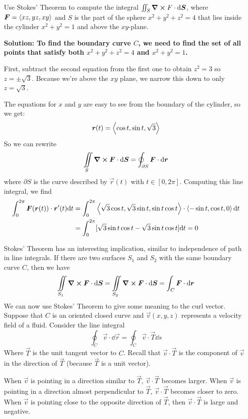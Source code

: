 \begin{example}
    Use Stokes' Theorem to compute the integral $\iint_S \curl F \cdot \dd \boldsymbol{S}$, where $\boldsymbol{F} = \left\langle xz, yz, xy\right\rangle$ and $S$ is the part of the sphere $x^2+y^2+z^2=4$ that lies inside the cylinder $x^2+y^2=1$ and above the $xy$-plane. \par
    \bf{Solution:} To find the boundary curve $C$, we need to find the set of all points that satisfy both $x^2+y^2+z^2=4$ and $x^2+y^2=1$. \par 
    First, subtract the second equation from the first one to obtain $z^2=3$ so $z=\pm \sqrt{3}$. Because we're above the $xy$ plane, we narrow this down to only $z=\sqrt 3$. \par
    The equations for $x$ and $y$ are easy to see from the boundary of the cylinder, so we get:
    \[ \boldsymbol{r}(t) = \left\langle \cos t, \sin t, \sqrt 3\right\rangle\]
    So we can rewrite
    \[ \iint\limits_S \curl \boldsymbol{F} \cdot \dd \boldsymbol{S} = \oint_{\partial S} \boldsymbol{F} \cdot \dd \boldsymbol{r}\]
    where $\partial S$ is the curve described by $\vec r(t)$ with $t\in[0,2\pi]$. Computing this line integral, we find
    \begin{align*}
        \int_0^{2\pi} \boldsymbol{F}(\boldsymbol{r}(t))\cdot \boldsymbol{r}'(t)\dd t &= \int_0^{2\pi}\left\langle\sqrt{3}\cos t, \sqrt{3}\sin t, \sin t\cos t\right\rangle \cdot \left\langle -\sin t, \cos t, 0\right\rangle \dd t \\
        &= \int_0^{2\pi}[\sqrt{3}\sin t \cos t - \sqrt{3}\sin t\cos t] \dd t = 0
    \end{align*}
\end{example}
Stokes' Theorem has an interesting implication, similar to independence of path in line integrals. If there are two surfaces $S_1$ and $S_2$ with the same boundary curve $C$, then we have
\[ \iint\limits_{S_1} \curl \boldsymbol{F} \cdot \dd \boldsymbol{S} = \iint\limits_{S_2}\curl \boldsymbol{F} \cdot \dd \boldsymbol{S} = \int_C \boldsymbol{F} \cdot \dd \boldsymbol{r}\]
We can now use Stokes' Theorem to give some meaning to the curl vector. Suppose that $C$ is an oriented closed curve and $\vec v(x,y,z)$ represents a velocity field of a fluid. Consider the line integral
\[ \oint_C \vec v \cdot \dd \vec r = \oint_C \vec v \cdot \vec T \dd s\]
Where $\vec T$ is the unit tangent vector to $C$. Recall that $\vec v \cdot \vec T$ is the component of $\vec v$ in the direction of $\vec T$ (because $\vec T$ is a unit vector). \par
When $\vec v$ is pointing in a direction similar to $\vec T$, $\vec v \cdot \vec T$ becomes larger. When $\vec v$ is pointing in a direction almost perpendicular to $\vec T$, $\vec v\cdot \vec T$ becomes closer to zero. When $\vec v$ is pointing close to the opposite direction of $\vec T$, then $\vec v\cdot \vec T$ is large and negative. \par
